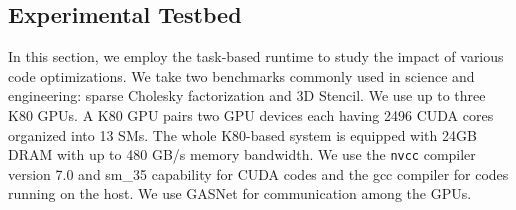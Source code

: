 \subsection{Experimental Testbed}
In this section, we employ the task-based runtime to study the impact of various code optimizations.
We take two benchmarks commonly used in science and engineering: sparse Cholesky factorization and 3D Stencil.
We use up to three K80 GPUs.
A K80 GPU pairs two GPU devices each having 2496 CUDA cores organized into 13 SMs.
The whole K80-based system is equipped with 24GB DRAM with up to 480 GB/s memory bandwidth.
We use the {\tt nvcc} compiler version 7.0 and sm\_35 capability for CUDA codes and the gcc compiler for codes running on the host.
We use GASNet for communication among the GPUs. 



